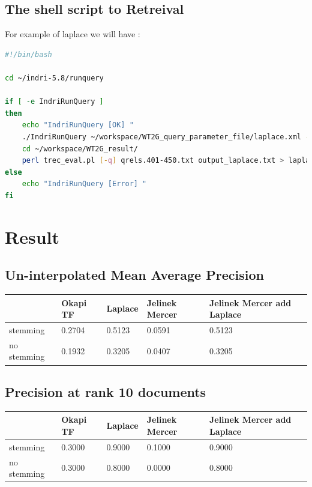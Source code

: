 \documentclass{article}
\begin{document}
\subsection{The shell script to Retreival}
For example of laplace we will have :
\begin{lstlisting}[language=bash,caption={ Run index shell scripts},basicstyle=\tiny]
#!/bin/bash

cd ~/indri-5.8/runquery

if [ -e IndriRunQuery ]
then
    echo "IndriRunQuery [OK] "
    ./IndriRunQuery ~/workspace/WT2G_query_parameter_file/laplace.xml -trecFormat=true > ~/workspace/WT2G_result/output_laplace.txt
    cd ~/workspace/WT2G_result/
    perl trec_eval.pl [-q] qrels.401-450.txt output_laplace.txt > laplace_evaluation.txt
else
    echo "IndriRunQuery [Error] "
fi
\end{lstlisting}


\newpage
\section{Result}

\subsection{Un-interpolated Mean Average Precision}
\begin{table}[htb]
  \begin{tabular}{|l|l|l|l|l|}
    \hline
            & Okapi TF&Laplace&Jelinek Mercer&Jelinek Mercer add Laplace \\
    \hline
   stemming &0.2704&0.5123&0.0591&0.5123\\
   \hline
   no stemming&0.1932&0.3205&0.0407&0.3205\\
   \hline
  \end{tabular}
\end{table}

\subsection{Precision at rank 10 documents}
\begin{table}[htb]
  \begin{tabular}{|l|l|l|l|l|}
    \hline
            & Okapi TF&Laplace&Jelinek Mercer&Jelinek Mercer add Laplace \\
    \hline
   stemming &0.3000&0.9000&0.1000&0.9000\\
   \hline
   no stemming&0.3000&0.8000&0.0000&0.8000\\
   \hline
  \end{tabular}
\end{table}
\end{document}
